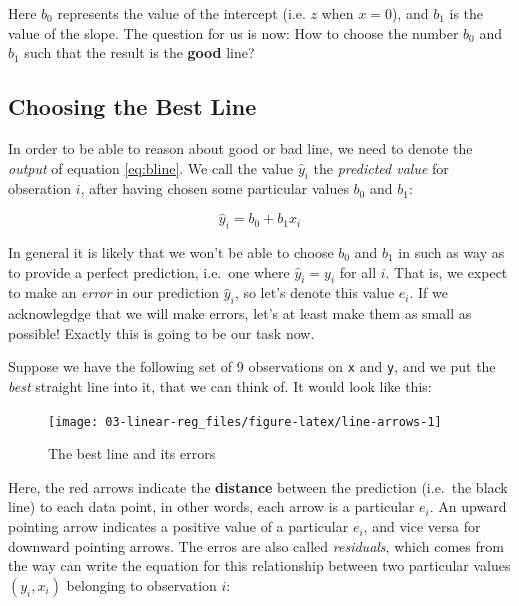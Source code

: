 \documentclass[]{book}
\begin{document}
Here \(b_0\) represents the value of the intercept (i.e. \(z\) when
\(x=0\)), and \(b_1\) is the value of the slope. The question for us is
now: How to choose the number \(b_0\) and \(b_1\) such that the result
is the \textbf{good} line?

\subsection{Choosing the Best Line}\label{choosing-the-best-line}

In order to be able to reason about good or bad line, we need to denote
the \emph{output} of equation \eqref{eq:bline}. We call the value
\(\hat{y}_i\) the \emph{predicted value} for obseration \(i\), after
having chosen some particular values \(b_0\) and \(b_1\):

\begin{equation}
\hat{y}_i = b_0 + b_1 x_i \label{eq:abline-pred}
\end{equation}

In general it is likely that we won't be able to choose \(b_0\) and
\(b_1\) in such as way as to provide a perfect prediction, i.e.~one
where \(\hat{y}_i = y_i\) for all \(i\). That is, we expect to make an
\emph{error} in our prediction \(\hat{y}_i\), so let's denote this value
\(e_i\). If we acknowlegdge that we will make errors, let's at least
make them as small as possible! Exactly this is going to be our task
now.

Suppose we have the following set of 9 observations on \texttt{x} and
\texttt{y}, and we put the \emph{best} straight line into it, that we
can think of. It would look like this:

\begin{figure}

{\centering \texttt{[image: 03-linear-reg\_files/figure-latex/line-arrows-1]} 

}

\caption{The best line and its errors}\label{fig:line-arrows}
\end{figure}

Here, the red arrows indicate the \textbf{distance} between the
prediction (i.e.~the black line) to each data point, in other words,
each arrow is a particular \(e_i\). An upward pointing arrow indicates a
positive value of a particular \(e_i\), and vice versa for downward
pointing arrows. The erros are also called \emph{residuals}, which comes
from the way can write the equation for this relationship between two
particular values \((y_i,x_i)\) belonging to observation \(i\):
\end{document}

